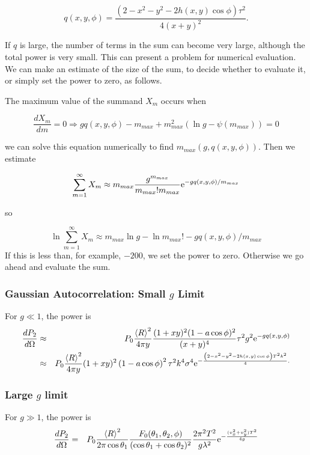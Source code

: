 \documentclass[11pt]{article}
\newcommand{\der}[2]{\frac{d {#1}}{d {#2}}}
\newcommand{\e}{{\rm e}}
\begin{document}
{{{{$$q(x,y,\phi)=\frac{\left(2-x^{2}-y^{2}-2h(x,y)\cos\phi\right)\tau^{2}}{4(x+y)^{2}}.$$

If $q$ is large, the number of terms in the sum can become very large,
although the total power is very small. This can present a problem for
numerical evaluation.  We can make an estimate of the size of the sum,
to decide whether to evaluate it, or simply set the power to zero, as
follows.

The maximum value of the summand $X_{m}$ occurs when

$$\der{X_{m}}{m}=0\Rightarrow gq(x,y,\phi)-m_{max}+m_{max}^{2}(\ln g-\psi(m_{max}))=0$$

we can solve this equation numerically to find $m_{max}(g,q(x,y,\phi)).$ Then we estimate

$$\sum_{m=1}^{\infty}X_{m}\approx m_{max}\frac{g^{m_{max}}}{m_{max}!m_{max}}\e^{-gq(x,y,\phi)/m_{max}}$$

so

$$\ln\sum_{m=1}^{\infty}X_{m}\approx m_{max}\ln g - \ln m_{max}!-gq(x,y,\phi)/m_{max}$$
If this is less than, for example, $-200$, we set the power to zero. Otherwise we go ahead and evaluate the sum.

\subsubsection{Gaussian Autocorrelation: Small $g$ Limit}

For $g\ll 1$, the power is
\begin{eqnarray}
\der{P_{2}}{\Omega}&\approx&P_{0}\frac{\left<R\right>^{2}}{4\pi y}\frac{(1+xy)^{2}(1-a\cos\phi)^{2}}{(x+y)^{4}}\tau^{2}g^{2}\e^{-gq(x,y,\phi)}\\
&\approx&P_{0}\frac{\left<R\right>^{2}}{4\pi y}(1+xy)^{2}\left(1-a\cos\phi\right)^{2}\tau^{2}k^{4}\sigma^{4}\e^{-\frac{\left(2-x^{2}-y^{2}-2h(x,y)\cos\phi\right)T^{2}k^{2}}{4}.}
\end{eqnarray}

\subsubsection{Large $g$ limit}
For $g\gg 1$, the power is
\begin{eqnarray}
\der{P_{2}}{\Omega}&=&P_{0}\frac{\left<R\right>^{2}}{2\pi\cos\theta_{1}}\frac{F_{0}(\theta_{1},\theta_{2},\phi)}{(\cos{\theta_{1}}+\cos{\theta_{2}})^{2}}\frac{2\pi^{2}T^{2}}{g\lambda^{2}}\e^{-\frac{(v_{x}^{2}+v_{y}^{2})T^{2}}{4g}}\end{eqnarray}

}}}}
\end{document}
